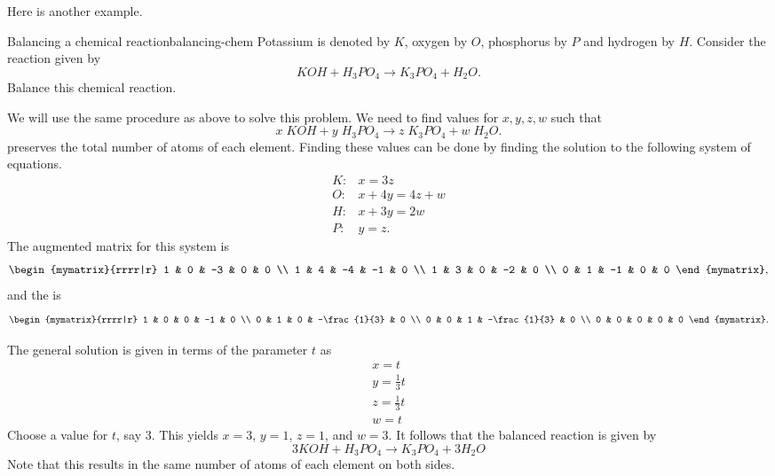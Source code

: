 Here is another example.

\begin{example}{Balancing a chemical reaction}{balancing-chem}
Potassium is denoted by $K$, oxygen by $O$,
phosphorus by $P$ and hydrogen by $H$.
Consider the reaction given by
\begin{equation*}
KOH+H_3PO_4\rightarrow K_3PO_4+H_2O.
\end{equation*}
Balance this chemical reaction.
\end{example}

\begin{solution}
We will use the same procedure as above to solve this problem. We need to find values for
$x,y,z,w$ such that
\begin{equation*}
x\;KOH+y\;H_3PO_4\rightarrow z\;K_3PO_4+w\;H_2O.
\end{equation*}
preserves the total number of atoms of each element.
Finding these values can be done by finding the solution to the following system of equations.
\begin{equation*}
\begin{array}{cl}
K: & x=3z \\
O: & x+4y=4z+w \\
H: & x+3y=2w \\
P: & y=z.
\end{array}
\end{equation*}
The augmented matrix for this system is
\begin{equation*}
\begin{mymatrix}{rrrr|r}
1 & 0 & -3 & 0 & 0 \\
1 & 4 & -4 & -1 & 0 \\
1 & 3 & 0 & -2 & 0 \\
0 & 1 & -1 & 0 & 0
\end{mymatrix},
\end{equation*}
and the {\rref} is
\begin{equation*}
\def\arraystretch{1.2}
\begin{mymatrix}{rrrr|r}
1 & 0 & 0 & -1 & 0 \\
0 & 1 & 0 & -\frac{1}{3} & 0 \\
0 & 0 & 1 & -\frac{1}{3} & 0 \\
0 & 0 & 0 & 0 & 0
\end{mymatrix}.
\end{equation*}

The general solution is given in terms of the parameter $t$ as
\begin{equation*}
\begin{array}{c}
x = t \\
y = \frac{1}{3}t \\
z = \frac{1}{3}t \\
w = t
\end{array}
\end{equation*}
Choose a value for $t$, say $3$. This yields $x=3$, $y=1$, $z=1$, and
$w=3$. It follows that the balanced reaction is given by
\begin{equation*}
3KOH+H_3PO_4\rightarrow K_3PO_4+3H_2O
\end{equation*}
Note that this results in the same number of atoms of each element on both sides.
\end{solution}

